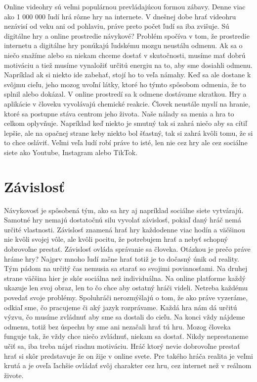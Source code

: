 \documentclass[10pt,twoside,english,a4paper]{article}
\begin{document}
Online videohry sú veľmi populárnou prevládajúcou formou zábavy. Denne viac ako 1 000 000 ľudí hrá rôzne hry na internete. V dnešnej dobe hrať videohru nezávisí od veku ani od pohlaviu, práve preto počet ľudí sa iba zvišuje.
Sú digitálne hry a online prostredie návykové? Problém spočíva v tom, že prostredie internetu a digitálne hry ponúkajú ľudskému mozgu neustálu odmenu. Ak sa o niečo snažíme alebo sa niekam chceme dostať v skutočnosti, musíme mať dobrú motiváciu a tiež musíme vynaložiť určitú energiu na to, aby sme dosiahli odmenu. Napríklad ak si niekto ide zabehať, stojí ho to veľa námahy. Keď sa ale dostane k svôjmu cieľu, jeho mozog uvoľní látky, ktoré ho týmto spôsobom odmenia, že to splnil alebo dokázal. V online prostredí sa k odmene dostávame skratkou.
Hry a aplikácie v človeku vyvolávajú chemické reakcie. Človek neustále myslí na hranie, ktoré sa postupne stáva centrom jeho života. Naše nálady sa menia a hra to celkom oplyvňuje. Napríklad keď niekto je smutný tak si zahrá niečo aby sa cítiľ lepšie, ale na opačnej strane keby niekto bol šťastný, tak si zahrá kvôli tomu, že si to chce osláviť. Veľmi veľa ludí robí práve to isté, len nie cez hry ale cez sociálne siete ako Youtube, Instagram alebo TikTok.

\section{Závislosť} \label{zavis}

Návykovosť je spôsobená tým, ako sa hry aj napríklad sociálne siete vytvárajú. 
Samotné hry nemajú dostatočnú silu vyvolať závislosť, pokiaľ daný hráč nemá určité vlastnosti. 
Závislosť znamená hrať hry každodenne viac hodín a väčšinou nie kvôli svojej vôle, ale kvôli pocitu, že potrebujem hrať a nebyť schopný dobrovoľne prestať. Závislosť ovláda správanie sa človeka. Otázkou je prečo práve hráme hry? Najprv mnoho ľudí začne hrať totiž je to dočasný únik od reality. Tým pádom na určitý čas nemusia sa starať so svojimi povinnosťami. Na druhej strane väčšina hier je skôr sociálna než individuálna. Na online platforme každý ukazuje len svoj obraz, len to čo chce aby ostatný hráči videli. Netreba každému povedať svoje problémy. Spoluhráči nerozmýšlajú o tom, že ako práve vyzeráme, odkiaľ sme, čo pracujeme či aký jazyk rozprávame.
Každá hra nám dá určitú výzvu, čo musíme zvládnuť aby sme sa dostali do cieľu. Na konci vždy nájdeme odmenu, totiž bez úspechu by sme ani nezačali hrať tú hru. Mozog človeka funguje tak, že vždy chce niečo zvládnuť, niekam sa dostať. Nikdy neprestaneme učiť sa, iba treba nájsť riadnu motiváciu. Hráč ktorý nevie dobrovoľne prestať hrať si skôr predstavuje že on žije v online svete. Pre takého hráča realita je veľmi krutá a je oveľa ľachšie ovládať svôj charakter cez hru, cez internet než v reálnom živote.
\end{document}
